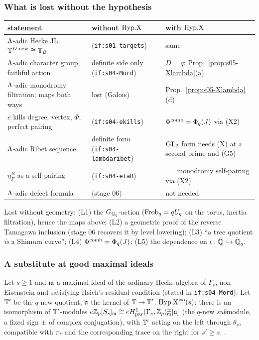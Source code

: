\subsubsection{What is lost without the hypothesis}
\begin{center}\small
\begin{longtable}{@{}p{5.2cm}p{4.3cm}p{5.0cm}@{}}
\toprule
statement & without $\mathrm{Hyp.X}$ & with $\mathrm{Hyp.X}$\\\midrule
$\Lambda$-adic Hecke JL $\mathbb{T}^{D\text{-new}}\cong\mathbb{T}_B$ & \stcited{} (\texttt{if:s01-targets}) & same\\
$\Lambda$-adic character group, faithful action & definite side only (\texttt{if:s04-Mord}) & $D=q$: Prop.~\ref{prop:s05-Xlambda}(a)\\
$\Lambda$-adic monodromy filtration; maps both ways & lost (Galois) & Prop.~\ref{prop:s05-Xlambda}(d)\\
$e$ kills degree, vertex, $\Phi$; perfect pairing & \stproved{} (\texttt{if:s04-ekills}) & $\Phi^{\mathrm{comb}}=\Phi_q(J)$ via (X2)\\
$\Lambda$-adic Ribet sequence & definite form (\texttt{if:s04-lambdaribet}) & $\mathrm{GL}_2$ form needs (X) at a second prime and (G5)\\
$\eta^B_F$ as a self-pairing & \stcited{} (\texttt{if:s04-etaB}) & $=$ monodromy self-pairing via (X2)\\
$\Lambda$-adic defect formula & \stpmc{} (stage 06) & not needed\\
\bottomrule
\end{longtable}
\end{center}
Lost without geometry: (L1) the $G_{\mathbb{Q}_q}$-action ($\mathrm{Frob}_q=qU_q$ on the torus, inertia filtration), hence the maps above;
(L2) a geometric proof of the reverse Tamagawa inclusion (stage 06 recovers it by level lowering); (L3) ``a tree quotient \emph{is}
a Shimura curve''; (L4) $\Phi^{\mathrm{comb}}=\Phi_q(J)$; (L5) the dependence on $\iota:\bar{\mathbb{Q}}\hookrightarrow\bar{\mathbb{Q}}_q$.

\subsubsection{A substitute at good maximal ideals}
\begin{definition}\label{def:s05-Xiso}
Let $s\ge1$ and $\mathfrak{m}$ a maximal ideal of the ordinary Hecke algebra of $\Gamma_s$, non-Eisenstein and satisfying Hsieh's residual
condition (stated in \texttt{if:s04-Mord}). Let $\mathbb{T}'$ be the $q$-new quotient, $\mathfrak{a}$ the kernel of $\mathbb{T}\to\mathbb{T}'$. $\mathrm{Hyp.X}^{\mathrm{iso}}(s)$:
there is an isomorphism of $\mathbb{T}'$-modules $e\mathbb{Z}_p[S_s]_{\mathfrak{m}}\cong eH^1_{\rm par}(\Gamma_s,\mathbb{Z}_p)^{\pm}_{\mathfrak{m}}[\mathfrak{a}]$ (the $q$-new
\emph{sub}module, a fixed sign $\pm$ of complex conjugation), with $\mathbb{T}'$ acting on the left through $\theta_s$, compatible with
$\pi_*$ and the corresponding trace on the right for $s'\ge s$. \sthyp.
\end{definition}

